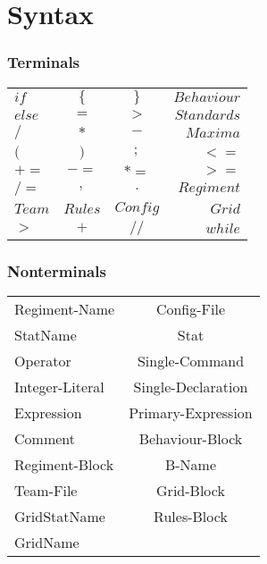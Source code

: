 \section{Syntax}
	\subsubsection{Terminals}
		
		\begin{tabular}{ l c c r}
			$if  	 $& $\{ 	 $&$ \} 	  $&$ Behaviour$  \\
		  	$else	 $&$ = 		 $&$ >  	  $&$ Standards$  \\
		 	$/ 		 $&$ *  	 $&$ -  	  $&$ Maxima$	  \\
		 	$( 		 $&$ )  	 $&$ ;  	  $&$ < =$		  \\
		 	$+= 	 $&$ -=   	 $&$ *= 	  $&$ > =$	    \\
		 	$/= 	 $&$ ,     	 $&$ .  	  $&$ Regiment$   \\
			$Team	 $&$ Rules   $&$ Config   $&$ Grid$	   \\
			$>		 $&$   + 	 $&$ //	 	  $&$ while $   \\
		\end{tabular}
	\subsubsection{Nonterminals}
		\begin{tabular}{l c}
			Regiment-Name	& Config-File		  \\
			StatName	 	& Stat				  \\
			Operator	    & Single-Command	  \\
			Integer-Literal	& Single-Declaration  \\
			Expression		& Primary-Expression  \\
			Comment			& Behaviour-Block	  \\
			Regiment-Block  & B-Name			  \\
			Team-File		& Grid-Block         	\\
			GridStatName	& Rules-Block			\\
			GridName	    & 					\\
			 
		\end{tabular}
	
